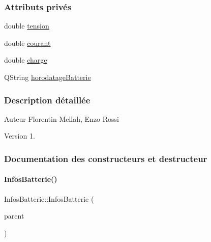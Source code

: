 \subsubsection*{Attributs privés}
\begin{DoxyCompactItemize}
\item 
double \hyperlink{class_infos_batterie_a45d09805075337f7f2d4b84d02a2ee47}{tension}
\item 
double \hyperlink{class_infos_batterie_a417f025b2ccddea7d28f80df4413945a}{courant}
\item 
double \hyperlink{class_infos_batterie_af3ad72cdbbf13f2dec6d81f078a2c0d2}{charge}
\item 
Q\+String \hyperlink{class_infos_batterie_a261067aff87023bccd60e59961ef1ffc}{horodatage\+Batterie}
\end{DoxyCompactItemize}


\subsubsection{Description détaillée}
\begin{DoxyAuthor}{Auteur}
Florentin Mellah, Enzo Rossi
\end{DoxyAuthor}
\begin{DoxyVersion}{Version}
1. 
\end{DoxyVersion}


\subsubsection{Documentation des constructeurs et destructeur}
\mbox{\label{class_infos_batterie_a8dea33c2515f2c30ea3a525e17c03fa2}} 
\paragraph{\texorpdfstring{Infos\+Batterie()}{InfosBatterie()}}
{\footnotesize\ttfamily Infos\+Batterie\+::\+Infos\+Batterie (\begin{DoxyParamCaption}\item[{\hyperlink{class_q_object}{Q\+Object} $\ast$}]{parent }\end{DoxyParamCaption})}


